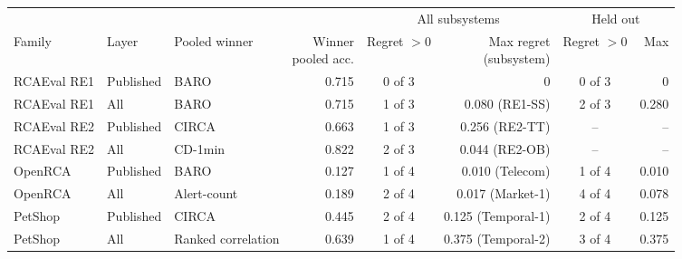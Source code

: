 \setlength{\tabcolsep}{4pt}
\begin{tabular}{@{}lllrcrcr@{}}
\toprule
 & & & & \multicolumn{2}{c}{All subsystems} & \multicolumn{2}{c}{Held out} \\
\cmidrule(lr){5-6} \cmidrule(lr){7-8}
Family & Layer & Pooled winner & \shortstack{Winner\\pooled acc.} & \shortstack{Regret\\$> 0$} & \shortstack{Max regret\\(subsystem)} & \shortstack{Regret\\$> 0$} & Max \\
\midrule
RCAEval RE1 & Published & BARO & 0.715 & 0 of 3 & 0 & 0 of 3 & 0 \\
RCAEval RE1 & All & BARO & 0.715 & 1 of 3 & 0.080 (RE1-SS) & 2 of 3 & 0.280 \\
RCAEval RE2 & Published & CIRCA & 0.663 & 1 of 3 & 0.256 (RE2-TT) & -- & -- \\
RCAEval RE2 & All & CD-1min & 0.822 & 2 of 3 & 0.044 (RE2-OB) & -- & -- \\
OpenRCA & Published & BARO & 0.127 & 1 of 4 & 0.010 (Telecom) & 1 of 4 & 0.010 \\
OpenRCA & All & Alert-count & 0.189 & 2 of 4 & 0.017 (Market-1) & 4 of 4 & 0.078 \\
PetShop & Published & CIRCA & 0.445 & 2 of 4 & 0.125 (Temporal-1) & 2 of 4 & 0.125 \\
PetShop & All & Ranked correlation & 0.639 & 1 of 4 & 0.375 (Temporal-2) & 3 of 4 & 0.375 \\
\bottomrule
\end{tabular}
